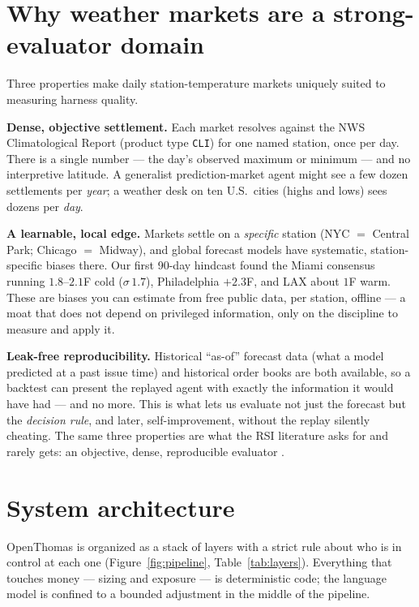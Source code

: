 \documentclass[sigconf,review,anonymous]{acmart}
\begin{document}
\section{Why weather markets are a strong-evaluator domain}
\label{sec:weather}

Three properties make daily station-temperature markets uniquely suited to
measuring harness quality.

\textbf{Dense, objective settlement.} Each market resolves against the NWS
Climatological Report (product type \texttt{CLI}) for one named station, once per
day. There is a single number --- the day's observed maximum or minimum --- and no
interpretive latitude. A generalist prediction-market agent might see a few dozen
settlements per \emph{year}; a weather desk on ten U.S.\ cities (highs and lows)
sees dozens per \emph{day}.

\textbf{A learnable, local edge.} Markets settle on a \emph{specific} station
(NYC $=$ Central Park; Chicago $=$ Midway), and global forecast models have
systematic, station-specific biases there. Our first 90-day hindcast found the
Miami consensus running $1.8$--$2.1$\textdegree{}F cold ($\sigma\,1.7$),
Philadelphia $+2.3$\textdegree{}F, and LAX about $1$\textdegree{}F warm. These are
biases you can estimate from free public data, per station, offline --- a moat
that does not depend on privileged information, only on the discipline to measure
and apply it.

\textbf{Leak-free reproducibility.} Historical ``as-of'' forecast data (what a
model predicted at a past issue time) and historical order books are both
available, so a backtest can present the replayed agent with exactly the
information it would have had --- and no more. This is what lets us evaluate not
just the forecast but the \emph{decision rule}, and later, self-improvement,
without the replay silently cheating. The same three properties are what the RSI
literature asks for and rarely gets: an objective, dense, reproducible evaluator
\cite{harness}.

\section{System architecture}
\label{sec:arch}

OpenThomas is organized as a stack of layers with a strict rule about who is in
control at each one (Figure~\ref{fig:pipeline}, Table~\ref{tab:layers}).
Everything that touches money --- sizing and exposure --- is deterministic code;
the language model is confined to a bounded adjustment in the middle of the
pipeline.
\end{document}
